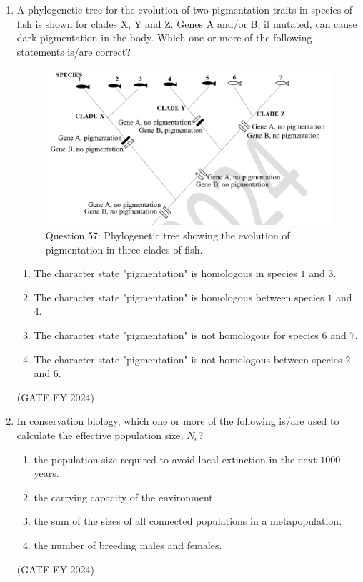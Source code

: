 \documentclass[journal]{IEEEtran}
\begin{document}
\begin{enumerate}
\item A phylogenetic tree for the evolution of two pigmentation traits in species of fish is shown for clades X, Y and Z. Genes A and/or B, if mutated, can cause dark pigmentation in the body. Which one or more of the following statements is/are correct?
\begin{figure}[!ht]
    \centering
    \includegraphics[width=0.8\columnwidth]{figs/Q-57.png}
    \caption{Question 57: Phylogenetic tree showing the evolution of pigmentation in three clades of fish.}
    \label{Q.57}
\end{figure}
    \begin{enumerate}
        \item The character state "pigmentation" is homologous in species $1$ and $3$.
        \item The character state "pigmentation" is homologous between species $1$ and $4$.
        \item The character state "pigmentation" is not homologous for species $6$ and $7$.
        \item The character state "pigmentation" is not homologous between species $2$ and $6$.
    \end{enumerate}
\hfill{(GATE EY 2024)}

\item In conservation biology, which one or more of the following is/are used to calculate the effective population size, $N_e$?
    \begin{enumerate}
        \item the population size required to avoid local extinction in the next $1000$ years.
        \item the carrying capacity of the environment.
        \item the sum of the sizes of all connected populations in a metapopulation.
        \item the number of breeding males and females.
    \end{enumerate}
\hfill{(GATE EY 2024)}


\end{enumerate}
\end{document}
